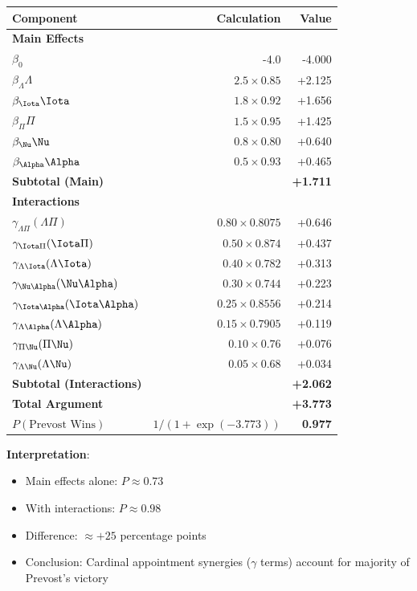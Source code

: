 \begin{table}[h]
\centering
\small
\begin{tabular}{|l|r|r|}
\hline
\textbf{Component} & \textbf{Calculation} & \textbf{Value} \\
\hline
\multicolumn{3}{|l|}{\textbf{Main Effects}} \\
\hline
$\beta_0$ & -4.0 & -4.000 \\
$\beta_\Lambda \Lambda$ & $2.5 \times 0.85$ & +2.125 \\
$\beta_\Iota \Iota$ & $1.8 \times 0.92$ & +1.656 \\
$\beta_\Pi \Pi$ & $1.5 \times 0.95$ & +1.425 \\
$\beta_\Nu \Nu$ & $0.8 \times 0.80$ & +0.640 \\
$\beta_\Alpha \Alpha$ & $0.5 \times 0.93$ & +0.465 \\
\hline
\textbf{Subtotal (Main)} & & \textbf{+1.711} \\
\hline
\multicolumn{3}{|l|}{\textbf{Interactions}} \\
\hline
$\gamma_{\Lambda\Pi}(\Lambda \Pi)$ & $0.80 \times 0.8075$ & +0.646 \\
$\gamma_{\Iota\Pi}(\Iota \Pi)$ & $0.50 \times 0.874$ & +0.437 \\
$\gamma_{\Lambda\Iota}(\Lambda \Iota)$ & $0.40 \times 0.782$ & +0.313 \\
$\gamma_{\Nu\Alpha}(\Nu \Alpha)$ & $0.30 \times 0.744$ & +0.223 \\
$\gamma_{\Iota\Alpha}(\Iota \Alpha)$ & $0.25 \times 0.8556$ & +0.214 \\
$\gamma_{\Lambda\Alpha}(\Lambda \Alpha)$ & $0.15 \times 0.7905$ & +0.119 \\
$\gamma_{\Pi\Nu}(\Pi \Nu)$ & $0.10 \times 0.76$ & +0.076 \\
$\gamma_{\Lambda\Nu}(\Lambda \Nu)$ & $0.05 \times 0.68$ & +0.034 \\
\hline
\textbf{Subtotal (Interactions)} & & \textbf{+2.062} \\
\hline
\textbf{Total Argument} & & \textbf{+3.773} \\
\hline
$P(\text{Prevost Wins})$ & $1/(1+\exp(-3.773))$ & \textbf{0.977} \\
\hline
\end{tabular}
\end{table}

\textbf{Interpretation}:
\begin{itemize}
\item Main effects alone: $P \approx 0.73$
\item With interactions: $P \approx 0.98$
\item Difference: $\approx +25$ percentage points
\item Conclusion: Cardinal appointment synergies ($\gamma$ terms) account for majority of Prevost's victory
\end{itemize}

